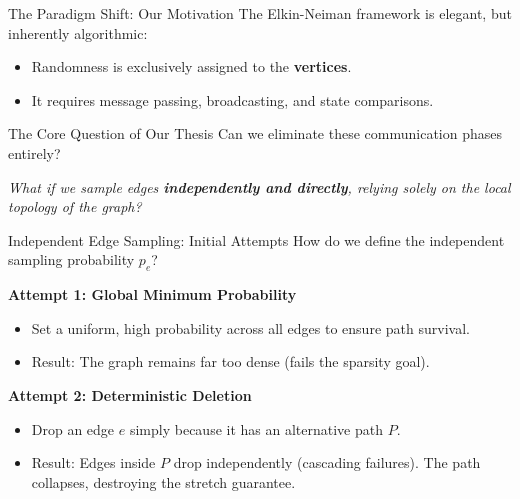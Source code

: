 \documentclass[10pt]{beamer}
\begin{document}
\begin{frame}{The Paradigm Shift: Our Motivation}
    The Elkin-Neiman framework is elegant, but inherently algorithmic:
    
    \vspace{0.3cm}
    \begin{itemize}
        \item Randomness is exclusively assigned to the \textbf{vertices}.
        \item It requires message passing, broadcasting, and state comparisons.
    \end{itemize}

    \vspace{0.8cm}
    \begin{alertblock}{The Core Question of Our Thesis}
        Can we eliminate these communication phases entirely? 
        
        \vspace{0.3cm}
        \textit{What if we sample edges \textbf{independently and directly}, relying solely on the local topology of the graph?}
    \end{alertblock}
\end{frame}

\begin{frame}{Independent Edge Sampling: Initial Attempts}
    How do we define the independent sampling probability $p_e$?
    
    \vspace{0.4cm}
    \textbf{Attempt 1: Global Minimum Probability}
    \begin{itemize}
        \item Set a uniform, high probability across all edges to ensure path survival.
        \item \textcolor{MetroOrange}{Result:} The graph remains far too dense (fails the sparsity goal).
    \end{itemize}

    \vspace{0.6cm}
    \textbf{Attempt 2: Deterministic Deletion}
    \begin{itemize}
        \item Drop an edge $e$ simply because it has an alternative path $P$.
        \item \textcolor{MetroOrange}{Result:} Edges inside $P$ drop independently (cascading failures). The path collapses, destroying the stretch guarantee.
    \end{itemize}
\end{frame}
\end{document}
